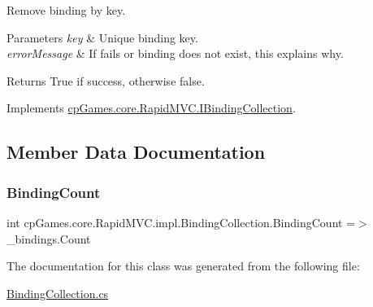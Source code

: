 Remove binding by key. 


\begin{DoxyParams}{Parameters}
{\em key} & Unique binding key.\\
\hline
{\em error\+Message} & If fails or binding does not exist, this explains why.\\
\hline
\end{DoxyParams}
\begin{DoxyReturn}{Returns}
True if success, otherwise false.
\end{DoxyReturn}


Implements \mbox{\hyperlink{interfacecp_games_1_1core_1_1_rapid_m_v_c_1_1_i_binding_collection_ab20c12c64a91e24e7685780dd64f1d87}{cp\+Games.\+core.\+Rapid\+M\+V\+C.\+I\+Binding\+Collection}}.



\subsection{Member Data Documentation}
\mbox{\label{classcp_games_1_1core_1_1_rapid_m_v_c_1_1impl_1_1_binding_collection_a2566408fe6b484b97b1fad9558efd8bd}} 
\subsubsection{\texorpdfstring{BindingCount}{BindingCount}}
{\footnotesize\ttfamily int cp\+Games.\+core.\+Rapid\+M\+V\+C.\+impl.\+Binding\+Collection.\+Binding\+Count =$>$ \+\_\+bindings.\+Count}



The documentation for this class was generated from the following file\+:\begin{DoxyCompactItemize}
\item 
\mbox{\hyperlink{_binding_collection_8cs}{Binding\+Collection.\+cs}}\end{DoxyCompactItemize}

